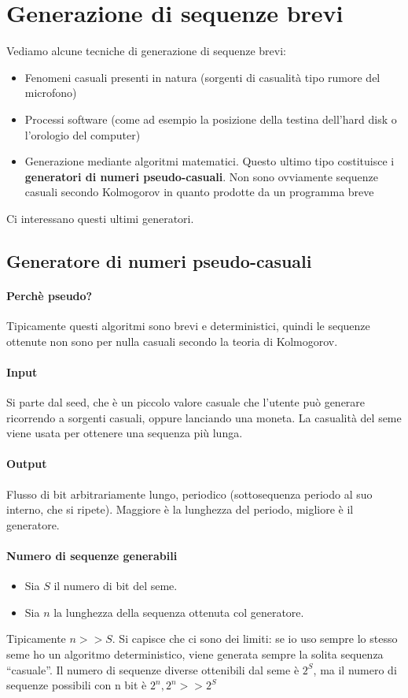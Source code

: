 \section{Generazione di sequenze brevi}
Vediamo alcune tecniche di generazione di sequenze brevi:
\begin{itemize}
    \item Fenomeni casuali presenti in natura (sorgenti di casualità tipo rumore del microfono)
    \item Processi software (come ad esempio la posizione della testina dell'hard disk o l'orologio del computer)
    \item Generazione mediante algoritmi matematici. Questo ultimo tipo costituisce i \textbf{generatori di numeri pseudo-casuali}. Non sono ovviamente sequenze casuali secondo Kolmogorov in quanto prodotte da un programma breve
\end{itemize}
Ci interessano questi ultimi generatori.
\subsection{Generatore di numeri pseudo-casuali}
\paragraph{Perchè pseudo?} Tipicamente questi algoritmi sono brevi e deterministici, quindi le sequenze ottenute non sono per nulla casuali secondo la teoria di Kolmogorov.

\paragraph{Input} Si parte dal seed, che è un piccolo valore casuale che l’utente può generare ricorrendo a sorgenti casuali, oppure lanciando una moneta. La casualità del seme viene usata per ottenere una sequenza più lunga.
\paragraph{Output} Flusso di bit arbitrariamente lungo, periodico (sottosequenza periodo al suo interno, che si ripete). Maggiore è la lunghezza del periodo, migliore è il generatore.

\paragraph{Numero di sequenze generabili}
\begin{itemize}
	\item Sia $S$ il numero di bit del seme.
	\item Sia $n$ la lunghezza della sequenza ottenuta col generatore.
\end{itemize}
Tipicamente $n>>S$. Si capisce che ci sono dei limiti: se io uso sempre lo stesso seme ho un algoritmo deterministico, viene generata sempre la solita sequenza “casuale”.
Il numero di sequenze diverse ottenibili dal seme è $2^S$, ma il numero di sequenze possibili con n bit è $2^n, 2^n>>2^S$


